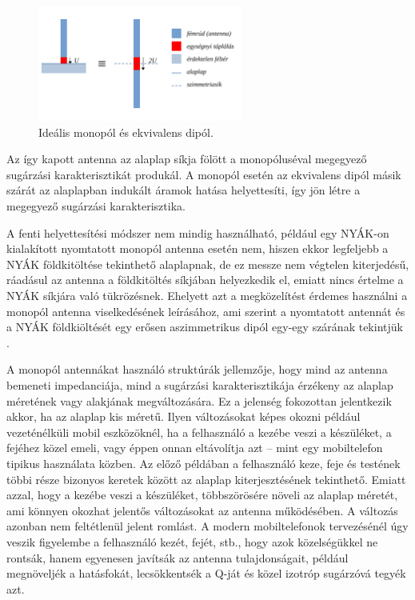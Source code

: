 \begin{figure}[h]
	\centering
	\includegraphics[width=0.6\textwidth]{kep/monopol.pdf}
	\caption{Ideális monopól és ekvivalens dipól.}
	\label{fig:monopol}
\end{figure}
\par Az így kapott antenna az alaplap síkja fölött a monopóluséval megegyező sugárzási karakterisztikát produkál. A monopól esetén az ekvivalens dipól másik szárát az alaplapban indukált áramok hatása helyettesíti, így jön létre a megegyező sugárzási karakterisztika.
\par A fenti helyettesítési módszer nem mindig használható, például egy NYÁK-on kialakított nyomtatott monopól antenna esetén nem, hiszen ekkor legfeljebb a NYÁK földkitöltése tekinthető alaplapnak, de ez messze nem végtelen kiterjedésű, ráadásul az antenna a földkitöltés síkjában helyezkedik el, emiatt nincs értelme a NYÁK síkjára való tükrözésnek. Ehelyett azt a megközelítést érdemes használni a monopól antenna viselkedésének leírásához, ami szerint a nyomtatott antennát és a NYÁK földkiöltését egy erősen aszimmetrikus dipól egy-egy szárának tekintjük \cite{multi-band}.
\par A monopól antennákat használó struktúrák jellemzője, hogy mind az antenna bemeneti impedanciája, mind a sugárzási karakterisztikája érzékeny az alaplap méretének vagy alakjának megváltozására. Ez a jelenség fokozottan jelentkezik akkor, ha az alaplap kis méretű. Ilyen változásokat képes okozni például vezeténélküli mobil eszközöknél, ha a felhasználó a kezébe veszi a készüléket, a fejéhez közel emeli, vagy éppen onnan eltávolítja azt -- mint egy mobiltelefon tipikus használata közben. Az előző példában a felhasználó keze, feje és testének többi része bizonyos keretek között az alaplap kiterjesztésének tekinthető. Emiatt azzal, hogy a kezébe veszi a készüléket, többszörösére növeli az alaplap méretét, ami könnyen okozhat jelentős változásokat az antenna működésében. A változás azonban nem feltétlenül jelent romlást. A modern mobiltelefonok tervezésénél úgy veszik figyelembe a felhasználó kezét, fejét, stb., hogy azok közelségükkel ne rontsák, hanem egyenesen javítsák az antenna tulajdonságait, például megnöveljék a hatásfokát, lecsökkentsék a Q-ját és közel izotróp sugárzóvá tegyék azt.
